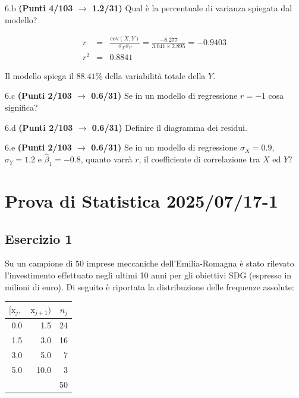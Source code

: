 \documentclass[
  11pt,
]{book}
\theoremstyle{mytheoremstyle}
\theoremstyle{mydefstyle}
\newenvironment{sol}
  {
  \begin{tcolorbox}[enhanced,breakable,arc=0.1mm,boxrule=1pt,colback=white,colframe=iblue,
  title=\bf \fontfamily{lmss}\selectfont \hspace{.5 cm} Soluzione,drop fuzzy shadow]

}{
\end{tcolorbox}
  }
\begin{document}
6.b \textbf{(Punti 4/103 \(\rightarrow\) 1.2/31)} Qual è la percentuale di varianza spiegata dal modello?

\begin{sol}
\begin{eqnarray*}
r&=&\frac{\text{cov}(X,Y)}{\sigma_X\sigma_Y}=\frac{ -8.277 }{ 3.041 \times 2.895 }= -0.9403 \\ 
r^2&=& 0.8841\end{eqnarray*}

Il modello spiega il \(88.41\%\) della variabilità totale della \(Y\).

\end{sol}

6.c \textbf{(Punti 2/103 \(\rightarrow\) 0.6/31)} Se in un modello di regressione \(r=-1\) cosa significa?

6.d \textbf{(Punti 2/103 \(\rightarrow\) 0.6/31)} Definire il diagramma dei residui.

6.e \textbf{(Punti 2/103 \(\rightarrow\) 0.6/31)} Se in un modello di regressione \(\hat\sigma_X=0.9\), \(\hat\sigma_Y=1.2\) e \(\hat\beta_1=-0.8\), quanto varrà \(r\), il coefficiente di correlazione tra \(X\) ed \(Y\)?

\section{Prova di Statistica 2025/07/17-1}\label{prova-di-statistica-20250717-1}

\subsection{Esercizio 1}\label{esercizio-1-49}

Su un campione di \(50\) imprese meccaniche dell'Emilia-Romagna è stato rilevato l'investimento effettuato negli ultimi 10 anni per gli obiettivi SDG (espresso in milioni di euro). Di seguito è riportata la distribuzione delle frequenze assolute:

\begin{table}[H]
\centering
\begin{tabular}{rrr}
\toprule
$[\text{x}_j,$ & $\text{x}_{j+1})$ & $n_j$\\
\midrule
0.0 & 1.5 & 24\\
1.5 & 3.0 & 16\\
3.0 & 5.0 & 7\\
5.0 & 10.0 & 3\\
 &  & 50\\
\bottomrule
\end{tabular}
\end{table}
\end{document}
